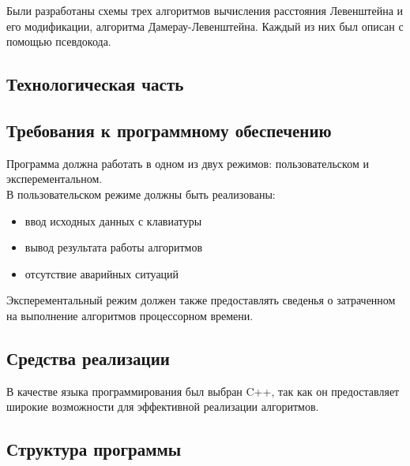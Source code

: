 \documentclass[a4paper,12pt]{article}
\begin{document}
    	\qquad Были разработаны схемы трех алгоритмов вычисления расстояния Левенштейна и его модификации, алгоритма Дамерау-Левенштейна. Каждый из них был описан с помощью псевдокода.
    	
    \newpage
    
    \begin{center}
     	\section{Технологическая часть}
    	\subsection{Требования к программному обеспечению}
    \end{center}
    
    	\quad Программа должна работать в одном из двух режимов: пользовательском и эксперементальном.\\
    	В пользовательском режиме должны быть реализованы: 
    	
    	\begin{itemize}
    		\item ввод исходных данных с клавиатуры 
    		\item вывод результата работы алгоритмов 
    		\item отсутствие аварийных ситуаций
    	\end{itemize}
		Эксперементальный режим должен также предоставлять сведенья о затраченном на выполнение алгоритмов процессорном времени.
    \begin{center}
        \subsection{Средства реализации}    
    \end{center}
    
		В качестве языка программирования был выбран C++, так как он предоставляет широкие возможности для эффективной реализации алгоритмов.
	\begin{center}
	\end{center}
	\begin{center}
		\subsection{Структура программы}	
		\end{center}
	
\end{document}

